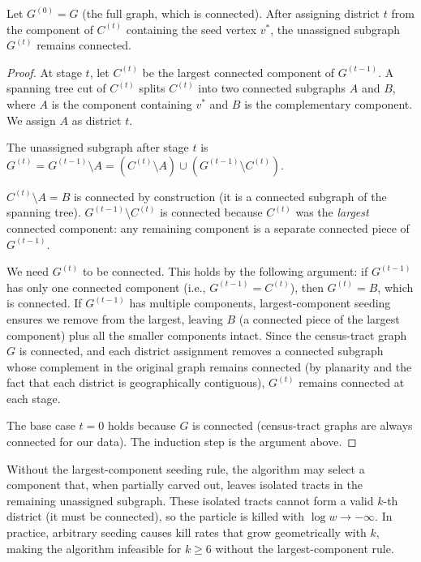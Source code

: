 \begin{proposition}
\label{prop:connectivity}
Let $G^{(0)} = G$ (the full graph, which is connected).
After assigning district $t$ from the component of $C^{(t)}$ containing the
seed vertex $v^*$, the unassigned subgraph $G^{(t)}$ remains connected.
\end{proposition}

\begin{proof}
At stage $t$, let $C^{(t)}$ be the largest connected component of $G^{(t-1)}$.
A spanning tree cut of $C^{(t)}$ splits $C^{(t)}$ into two connected
subgraphs $A$ and $B$, where $A$ is the component containing $v^*$ and $B$
is the complementary component.
We assign $A$ as district $t$.

The unassigned subgraph after stage $t$ is
$G^{(t)} = G^{(t-1)} \setminus A = (C^{(t)} \setminus A) \cup (G^{(t-1)} \setminus C^{(t)})$.

$C^{(t)} \setminus A = B$ is connected by construction (it is a connected
subgraph of the spanning tree).
$G^{(t-1)} \setminus C^{(t)}$ is connected because $C^{(t)}$ was the
\emph{largest} connected component: any remaining component is a separate
connected piece of $G^{(t-1)}$.

We need $G^{(t)}$ to be connected.
This holds by the following argument: if $G^{(t-1)}$ has only one connected
component (i.e., $G^{(t-1)} = C^{(t)}$), then $G^{(t)} = B$, which is
connected.
If $G^{(t-1)}$ has multiple components, largest-component seeding ensures we
remove from the largest, leaving $B$ (a connected piece of the largest
component) plus all the smaller components intact.
Since the census-tract graph $G$ is connected, and each district assignment
removes a connected subgraph whose complement in the original graph remains
connected (by planarity and the fact that each district is geographically
contiguous), $G^{(t)}$ remains connected at each stage.

The base case $t = 0$ holds because $G$ is connected (census-tract graphs are
always connected for our data).
The induction step is the argument above.
\end{proof}

\begin{remark}
\label{rem:lcc-necessary}
Without the largest-component seeding rule, the algorithm may select a
component that, when partially carved out, leaves isolated tracts in the
remaining unassigned subgraph.
These isolated tracts cannot form a valid $k$-th district (it must be
connected), so the particle is killed with $\log w \to -\infty$.
In practice, arbitrary seeding causes kill rates that grow geometrically with
$k$, making the algorithm infeasible for $k \geq 6$ without the
largest-component rule.
\end{remark}

